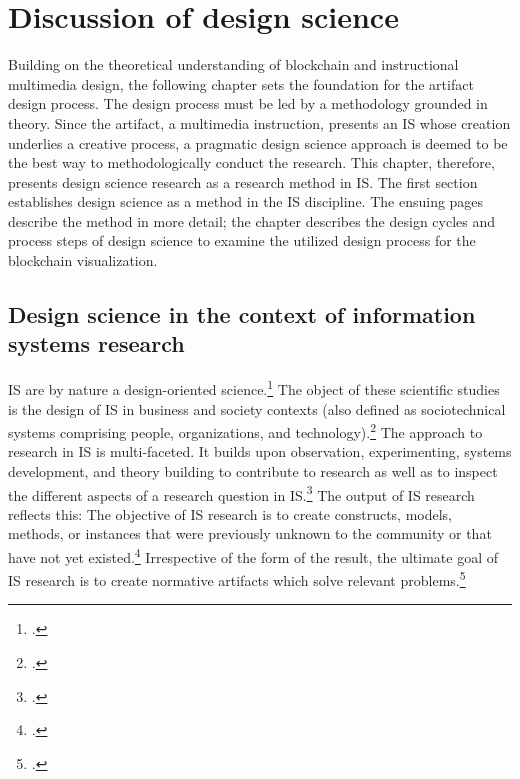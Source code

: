 \chapter{Discussion of design science} \label{chap:DesignScience}

Building on the theoretical understanding of blockchain and instructional multimedia design, the following chapter sets the foundation for the artifact design process. The design process must be led by a methodology grounded in theory. Since the artifact, a multimedia instruction, presents an \ac{IS} whose creation underlies a creative process, a pragmatic design science approach is deemed to be the best way to methodologically conduct the research. This chapter, therefore, presents design science research as a research method in \ac{IS}. The first section establishes design science as a method in the \ac{IS} discipline. The ensuing pages describe the method in more detail; the chapter describes the design cycles and process steps of design science to examine the utilized design process for the blockchain visualization.

\section{Design science in the context of information systems research} \label{DesignScienceInISR}

\acf{IS} are by nature a design-oriented science.\footcites[Cf. in addition][]{OsterleGestaltungsorientierteWirtschaftsinformatikPladoyer2010} The object of these scientific studies is the design of \acl{IS} in business and society contexts (also defined as sociotechnical systems comprising people, organizations, and technology).\footcites[Cf.][p.671]{OsterleMemorandumzurgestaltungsorientierten2010}[cf.][p.98]{HevnerDesignScienceResearch2004}[cf.][p.11]{OsterleGestaltungsorientierteWirtschaftsinformatikPladoyer2010}[cf.][p.252]{MarchDesignnaturalscience1995}
The approach to research in \ac{IS} is multi-faceted. It builds upon observation, experimenting, systems development, and theory building to contribute to research as well as to inspect the different aspects of a research question in \ac{IS}.\footcite[Cf.][p.86]{NunamakerSystemsdevelopmentInformation1991} The output of \ac{IS} research reflects this: The objective of \ac{IS} research is to create constructs, models, methods, or instances that were previously unknown to the community or that have not yet existed.\footcites[Cf.][p.12]{OsterleGestaltungsorientierteWirtschaftsinformatikPladoyer2010}[cf.][p.130]{ThomasBekannteundweniger2014} 
Irrespective of the form of the result, the ultimate goal of \ac{IS} research is to create normative artifacts which solve relevant problems.\footcite[Cf.][p.130]{ThomasBekannteundweniger2014}

